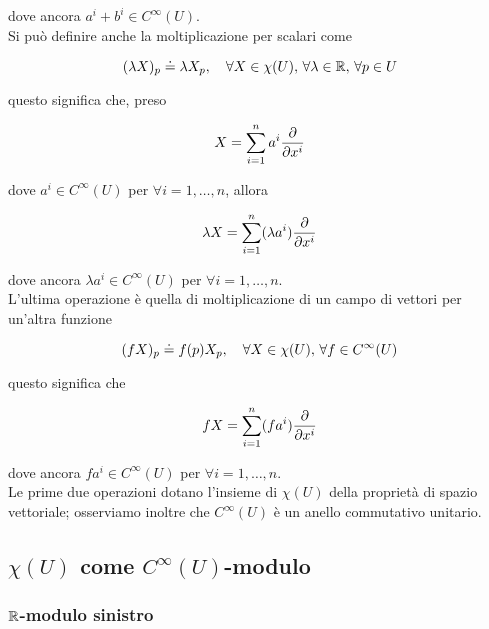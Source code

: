 dove ancora $ a^{i}+b^{i} \in C^{\infty}(U) $.\\
Si può definire anche la moltiplicazione per scalari come

\begin{equation}
	(\lambda X)_{p} \doteq \lambda X_{p} \qcomma \forall X \in \chi(U), \, \forall \lambda \in \R, \, \forall p \in U
\end{equation}

questo significa che, preso

\begin{equation}
	X = \sum_{i=1}^{n} a^{i} \pdv{x^{i}}
\end{equation}

dove $ a^{i} \in C^{\infty}(U) $ per $ \forall i = 1, \dots, n $, allora

\begin{equation}
	\lambda X = \sum_{i=1}^{n} (\lambda a^{i}) \pdv{x^{i}}
\end{equation}

dove ancora $ \lambda a^{i} \in C^{\infty}(U) $ per $ \forall i = 1, \dots, n $.\\
L'ultima operazione è quella di moltiplicazione di un campo di vettori per un'altra funzione

\begin{equation}
	(f X)_{p} \doteq f(p) X_{p} \qcomma \forall X \in \chi(U), \, \forall f \in C^{\infty}(U)
\end{equation}

questo significa che

\begin{equation}
	f X = \sum_{i=1}^{n} (f a^{i}) \pdv{x^{i}}
\end{equation}

dove ancora $ f a^{i} \in C^{\infty}(U) $ per $ \forall i=1,\dots,n $.\\
Le prime due operazioni dotano l'insieme di $ \chi(U) $ della proprietà di spazio vettoriale; osserviamo inoltre che $ C^{\infty}(U) $ è un anello commutativo unitario.

\subsection{$ \chi(U) $ come $ C^{\infty}(U) $-modulo}

\subsubsection{$ \mathbb{R} $-modulo sinistro}

